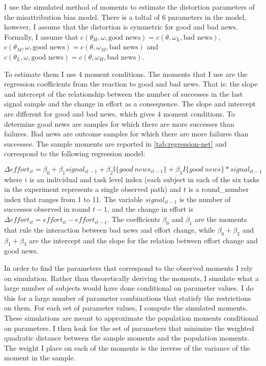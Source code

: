 \documentclass[
  12pt,
]{article}
\begin{document}
I use the simulated method of moments to estimate the distortion
parameters of the misattribution bias model. There is a toltal of 6
parameters in the model, however, I assume that the distortion is
symmetric for good and bad news. Formally, I assume that
\(c(\theta_H, \omega, \text{good news})=c(\theta, \omega_L, \text{bad news})\),
\(c(\theta_M, \omega, \text{good news})=c(\theta, \omega_M, \text{bad news})\)
and
\(c(\theta_L, \omega, \text{good news})=c(\theta, \omega_H, \text{bad news})\).

To estimate them I use 4 moment conditions. The moments that I use are
the regression coefficients from the reaction to good and bad news. That
is: the slope and intercept of the relationship between the number of
successes in the last signal sample and the change in effort as a
consequence. The slope and intercept are different for good and bad
news, which gives 4 moment conditions. To determine good news are
samples for which there are more successes than failures. Bad news are
outcome samples for which there are more failures than successes. The
sample moments are reported in \ref{tab:regression-net} and correspond
to the following regression model:

\[ \Delta effort_{it} = \beta_0 + \beta_1 signal_{i t-1} + \beta_2\mathbb{I}\{good \:news_{i t-1}\} + \beta_3{I}\{good\:news\}*signal_{i t-1} \]
where \(i\) is an individual and task level index (each subject in each
of the six tasks in the experiment represents a single observed path)
and \(t\) is a round\_number index that ranges from 1 to 11. The
variable \(signal_{i t-1}\) is the number of successes observed in round
\(t-1\), and the change in effort is
\(\Delta effort_{it}=effort_{it}-effort_{it-1}\). The coefficients
\(\beta_0\) and \(\beta_1\) are the moments that rule the interaction
between bad news and effort change, while \(\beta_0+\beta_2\) and
\(\beta_1 +\beta_3\) are the intercept and the slope for the relation
between effort change and good news.

In order to find the parameters that correspond to the observed moments
I rely on simulation. Rather than theoretically deriving the moments, I
simulate what a large number of subjects would have done conditional on
parameter values. I do this for a large number of parameter combinations
that statisfy the restrictions on them. For each set of parameter
values, I compute the simulated moments. These simulations are meant to
approximate the population moments conditional on parameters. I then
look for the set of parameters that minimize the weighted quadratic
distance between the sample moments and the population moments. The
weight I place on each of the moments is the inverse of the variance of
the moment in the sample.
\end{document}
